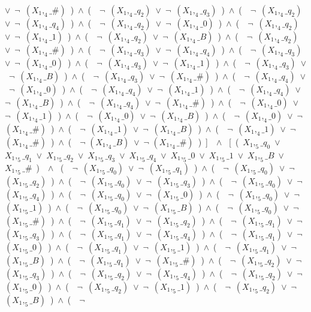 ﻿\documentclass[a4paper,10pt]{article}
\begin{document}
$\vee$\ $\neg$\ $(X_1,_4\_\#)$\ )\ $\wedge$\ (\ \ $\neg$\ $(X_1,_4\_q_2)$\ $\vee$\ $\neg$\ $(X_1,_4\_q_3)$\ )\ $\wedge$\ (\ \ $\neg$\ $(X_1,_4\_q_2)$\ $\vee$\ $\neg$\ $(X_1,_4\_q_4)$\ )\ $\wedge$\ (\ \ $\neg$\ $(X_1,_4\_q_2)$\ $\vee$\ $\neg$\ $(X_1,_4\_0)$\ )\ $\wedge$\ (\ \ $\neg$\ $(X_1,_4\_q_2)$\ $\vee$\ $\neg$\ $(X_1,_4\_1)$\ )\ $\wedge$\ (\ \ $\neg$\ $(X_1,_4\_q_2)$\ $\vee$\ $\neg$\ $(X_1,_4\_B)$\ )\ $\wedge$\ (\ \ $\neg$\ $(X_1,_4\_q_2)$\ $\vee$\ $\neg$\ $(X_1,_4\_\#)$\ )\ $\wedge$\ (\ \ $\neg$\ $(X_1,_4\_q_3)$\ $\vee$\ $\neg$\ $(X_1,_4\_q_4)$\ )\ $\wedge$\ (\ \ $\neg$\ $(X_1,_4\_q_3)$\ $\vee$\ $\neg$\ $(X_1,_4\_0)$\ )\ $\wedge$\ (\ \ $\neg$\ $(X_1,_4\_q_3)$\ $\vee$\ $\neg$\ $(X_1,_4\_1)$\ )\ $\wedge$\ (\ \ $\neg$\ $(X_1,_4\_q_3)$\ $\vee$\ $\neg$\ $(X_1,_4\_B)$\ )\ $\wedge$\ (\ \ $\neg$\ $(X_1,_4\_q_3)$\ $\vee$\ $\neg$\ $(X_1,_4\_\#)$\ )\ $\wedge$\ (\ \ $\neg$\ $(X_1,_4\_q_4)$\ $\vee$\ $\neg$\ $(X_1,_4\_0)$\ )\ $\wedge$\ (\ \ $\neg$\ $(X_1,_4\_q_4)$\ $\vee$\ $\neg$\ $(X_1,_4\_1)$\ )\ $\wedge$\ (\ \ $\neg$\ $(X_1,_4\_q_4)$\ $\vee$\ $\neg$\ $(X_1,_4\_B)$\ )\ $\wedge$\ (\ \ $\neg$\ $(X_1,_4\_q_4)$\ $\vee$\ $\neg$\ $(X_1,_4\_\#)$\ )\ $\wedge$\ (\ \ $\neg$\ $(X_1,_4\_0)$\ $\vee$\ $\neg$\ $(X_1,_4\_1)$\ )\ $\wedge$\ (\ \ $\neg$\ $(X_1,_4\_0)$\ $\vee$\ $\neg$\ $(X_1,_4\_B)$\ )\ $\wedge$\ (\ \ $\neg$\ $(X_1,_4\_0)$\ $\vee$\ $\neg$\ $(X_1,_4\_\#)$\ )\ $\wedge$\ (\ \ $\neg$\ $(X_1,_4\_1)$\ $\vee$\ $\neg$\ $(X_1,_4\_B)$\ )\ $\wedge$\ (\ \ $\neg$\ $(X_1,_4\_1)$\ $\vee$\ $\neg$\ $(X_1,_4\_\#)$\ )\ $\wedge$\ (\ \ $\neg$ $(X_1,_4\_B)$\ $\vee$\ $\neg$ $(X_1,_4\_\#)$\ )\ ]\ \ $\wedge$ \ [\ (\ $X_1,_5\_q_0$\ $\vee$\ $X_1,_5\_q_1$\ $\vee$\ $X_1,_5\_q_2$\ $\vee$\ $X_1,_5\_q_3$\ $\vee$\ $X_1,_5\_q_4$\ $\vee$\ $X_1,_5\_0$\ $\vee$\ $X_1,_5\_1$\ $\vee$\ $X_1,_5\_B$\ $\vee$\ $X_1,_5\_\#$\ )\ \ $\wedge$ \ (\ \ $\neg$\ $(X_1,_5\_q_0)$\ $\vee$\ $\neg$\ $(X_1,_5\_q_1)$\ )\ $\wedge$\ (\ \ $\neg$\ $(X_1,_5\_q_0)$\ $\vee$\ $\neg$\ $(X_1,_5\_q_2)$\ )\ $\wedge$\ (\ \ $\neg$\ $(X_1,_5\_q_0)$\ $\vee$\ $\neg$\ $(X_1,_5\_q_3)$\ )\ $\wedge$\ (\ \ $\neg$\ $(X_1,_5\_q_0)$\ $\vee$\ $\neg$\ $(X_1,_5\_q_4)$\ )\ $\wedge$\ (\ \ $\neg$\ $(X_1,_5\_q_0)$\ $\vee$\ $\neg$\ $(X_1,_5\_0)$\ )\ $\wedge$\ (\ \ $\neg$\ $(X_1,_5\_q_0)$\ $\vee$\ $\neg$\ $(X_1,_5\_1)$\ )\ $\wedge$\ (\ \ $\neg$\ $(X_1,_5\_q_0)$\ $\vee$\ $\neg$\ $(X_1,_5\_B)$\ )\ $\wedge$\ (\ \ $\neg$\ $(X_1,_5\_q_0)$\ $\vee$\ $\neg$\ $(X_1,_5\_\#)$\ )\ $\wedge$\ (\ \ $\neg$\ $(X_1,_5\_q_1)$\ $\vee$\ $\neg$\ $(X_1,_5\_q_2)$\ )\ $\wedge$\ (\ \ $\neg$\ $(X_1,_5\_q_1)$\ $\vee$\ $\neg$\ $(X_1,_5\_q_3)$\ )\ $\wedge$\ (\ \ $\neg$\ $(X_1,_5\_q_1)$\ $\vee$\ $\neg$\ $(X_1,_5\_q_4)$\ )\ $\wedge$\ (\ \ $\neg$\ $(X_1,_5\_q_1)$\ $\vee$\ $\neg$\ $(X_1,_5\_0)$\ )\ $\wedge$\ (\ \ $\neg$\ $(X_1,_5\_q_1)$\ $\vee$\ $\neg$\ $(X_1,_5\_1)$\ )\ $\wedge$\ (\ \ $\neg$\ $(X_1,_5\_q_1)$\ $\vee$\ $\neg$\ $(X_1,_5\_B)$\ )\ $\wedge$\ (\ \ $\neg$\ $(X_1,_5\_q_1)$\ $\vee$\ $\neg$\ $(X_1,_5\_\#)$\ )\ $\wedge$\ (\ \ $\neg$\ $(X_1,_5\_q_2)$\ $\vee$\ $\neg$\ $(X_1,_5\_q_3)$\ )\ $\wedge$\ (\ \ $\neg$\ $(X_1,_5\_q_2)$\ $\vee$\ $\neg$\ $(X_1,_5\_q_4)$\ )\ $\wedge$\ (\ \ $\neg$\ $(X_1,_5\_q_2)$\ $\vee$\ $\neg$\ $(X_1,_5\_0)$\ )\ $\wedge$\ (\ \ $\neg$\ $(X_1,_5\_q_2)$\ $\vee$\ $\neg$\ $(X_1,_5\_1)$\ )\ $\wedge$\ (\ \ $\neg$\ $(X_1,_5\_q_2)$\ $\vee$\ $\neg$\ $(X_1,_5\_B)$\ )\ $\wedge$\ (\ \ $\neg$\ 
\end{document}
